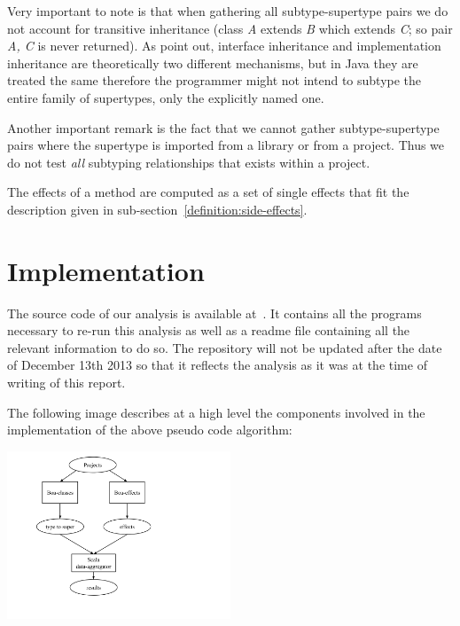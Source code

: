 \documentclass{acm_proc_article-sp}
\begin{document}
Very important to note is that when gathering all subtype-supertype pairs we do not account for
transitive inheritance (class \emph{A} extends \emph{B} which extends \emph{C}; so pair \emph{A, C} is never returned). As \cite{america1991designing, szyperski2002component} point out, interface inheritance and implementation inheritance are theoretically two different mechanisms, but in Java they are treated the same therefore the programmer might not intend to subtype the entire family of supertypes, only the explicitly named one.

Another important remark is the fact that we cannot gather subtype-supertype pairs where the supertype is imported from a library or from a project. Thus we do not test \emph{all} subtyping relationships that exists within a project.

The effects of a method are computed as a set of single effects that fit the description given in sub-section~\ref{definition:side-effects}.

\section{Implementation}\label{section:implementation}
The source code of our analysis is available at~\cite{github2013}. It contains all the programs necessary to re-run this analysis as well as a readme file containing all the relevant information to do so. The repository will not be updated after the date of December 13th 2013 so that it reflects the analysis as it was at the time of writing of this report.

The following image describes at a high level the components involved in the implementation of the above pseudo code algorithm:
     
\includegraphics[width=0.5\textwidth, clip=true, trim= 125px 90px 300px 20px]{high-level}
\end{document}

